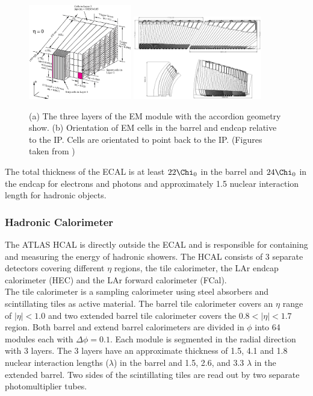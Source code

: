 \begin{figure}[h!]
\centering
\includegraphics[width=0.40\textwidth, angle=0]{figures/LHC_ATLAS/LARG3-TDR-barrelM.eps}
\includegraphics[width=0.50\textwidth, angle=0]{figures/LHC_ATLAS/LARG3-abcdM.eps}
\caption{ (a) The three layers of the EM module with the accordion geometry show. (b) Orientation of EM cells in the barrel and endcap relative to the IP.  Cells are orientated to point back to the IP.  (Figures taken from \cite{ATLAS_JINST}) \label{LHC:fig:EMCalo}}
\end{figure}

\indent The total thickness of the ECAL is at least $22 \Chi_0$ in the barrel and $24 \Chi_0$ in the endcap for electrons and photons and approximately 1.5 nuclear interaction length for hadronic objects. \\

\subsubsection*{Hadronic Calorimeter}

\indent The ATLAS HCAL is directly outside the ECAL and is responsible for containing and measuring the energy of hadronic showers.  The HCAL consists of 3 separate detectors covering different $\eta$ regions, the tile calorimeter, the LAr endcap calorimeter (HEC) and the LAr forward calorimeter (FCal).  \\

\indent The tile calorimeter is a sampling calorimeter using steel absorbers and scintillating tiles as active material. The barrel tile calorimeter covers an $\eta$ range of $|\eta| < 1.0$ and two extended barrel tile calorimeter covers the $0.8 < |\eta| < 1.7$ region.  Both barrel and extend barrel calorimeters are divided in $\phi$ into 64 modules each with $\Delta\phi = 0.1$.  Each module is segmented in the radial direction with 3 layers.  The 3 layers have an approximate thickness of 1.5, 4.1 and 1.8 nuclear interaction lengths ($\lambda$) in the barrel and 1.5, 2.6, and 3.3 $\lambda$ in the extended barrel.  Two sides of the scintillating tiles are read out by two separate photomultiplier tubes. \\

